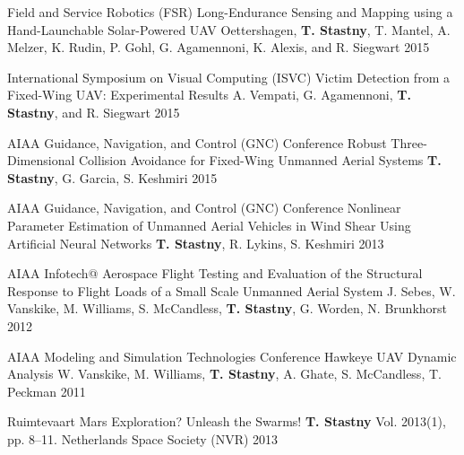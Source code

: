 \begin{cventries}
\cvpubentry
	{Field and Service Robotics (FSR)} %
	{Long-Endurance Sensing and Mapping using a Hand-Launchable Solar-Powered UAV} %
	{Oettershagen, \textbf{T. Stastny}, T. Mantel, A. Melzer, K. Rudin, P. Gohl, G. Agamennoni, K. Alexis, and R. Siegwart} %
	{} %
	{2015} %
	{} %
	{} %

\cvpubentry
	{International Symposium on Visual Computing (ISVC)} %
	{Victim Detection from a Fixed-Wing UAV: Experimental Results} %
	{A. Vempati, G. Agamennoni, \textbf{T. Stastny}, and R. Siegwart} %
	{} %
	{2015} %
	{} %
	{} %
	
\cvpubentry
	{AIAA Guidance, Navigation, and Control (GNC) Conference} %
	{Robust Three-Dimensional Collision Avoidance for Fixed-Wing Unmanned Aerial Systems} %
	{\textbf{T. Stastny}, G. Garcia, S. Keshmiri} %
	{} %
	{2015} %
	{} %
	{} %
	
\cvpubentry
	{AIAA Guidance, Navigation, and Control (GNC) Conference} %
	{Nonlinear Parameter Estimation of Unmanned Aerial Vehicles in Wind Shear Using Artificial Neural Networks} %
	{\textbf{T. Stastny}, R. Lykins, S. Keshmiri} %
	{} %
	{2013} %
	{} %
	{} %
		
\cvpubentry
	{AIAA Infotech@ Aerospace} %
	{Flight Testing and Evaluation of the Structural Response to Flight Loads of a Small Scale Unmanned Aerial System} %
	{J. Sebes, W. Vanskike, M. Williams, S. McCandless, \textbf{T. Stastny}, G. Worden, N. Brunkhorst} %
	{} %
	{2012} %
	{} %
	{} %

\cvpubentry
	{AIAA Modeling and Simulation Technologies Conference} %
	{Hawkeye UAV Dynamic Analysis} %
	{W. Vanskike, M. Williams, \textbf{T. Stastny}, A. Ghate, S. McCandless, T. Peckman} %
	{} %
	{2011} %
	{} %
	{} %


\begin{flushleft}
\end{flushleft}
	
\cvpubentry
	{Ruimtevaart} %
	{Mars Exploration? Unleash the Swarms!} %
	{\textbf{T. Stastny}} %
	{Vol. 2013(1), pp. 8--11. Netherlands Space Society (NVR)} %
	{2013} %
	{} %
	{} %
	

\end{cventries}

